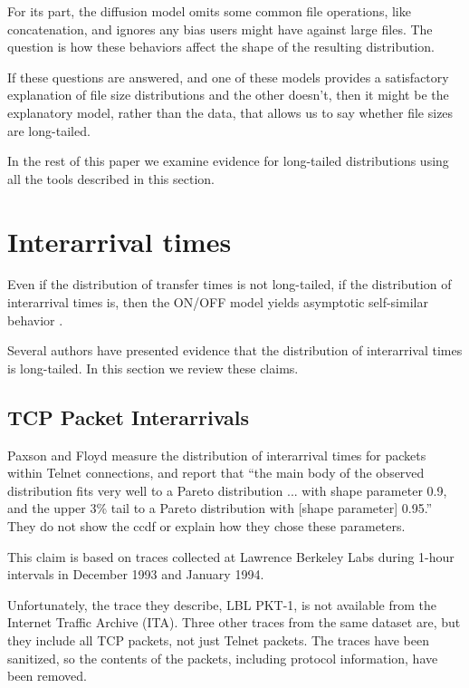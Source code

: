 \documentclass[twocolumn,11pt]{infocom}
\begin{document}
For its part, the diffusion model omits some common file operations,
like concatenation, and ignores any bias users might have
against large files.  The question is
how these behaviors affect the shape of the resulting distribution.

If these questions are answered, and one of these models provides a
satisfactory explanation of file size distributions and the other
doesn't, then it might be the explanatory model, rather than the data,
that allows us to say whether file sizes are long-tailed.

In the rest of this paper we examine evidence for long-tailed
distributions using all the tools described in this section.


\section {Interarrival times}

Even if the distribution of transfer times is not long-tailed,
if the distribution of interarrival times is, then the ON/OFF
model yields asymptotic self-similar behavior
\cite{TaqquWillingerSherman97}.

Several authors have presented evidence that the distribution
of interarrival times is long-tailed.  In this section we review
these claims.


\subsection{TCP Packet Interarrivals}

Paxson and Floyd \cite{PaxsonFloyd95}
measure the distribution of interarrival times for packets
within Telnet connections, and report that ``the main body
of the observed distribution fits very well to a Pareto
distribution ... with shape parameter 0.9, and the upper 3\%
tail to a Pareto distribution with [shape parameter] 0.95.''
They do not show the ccdf or explain how they chose these parameters.

This claim is based on traces collected at Lawrence Berkeley Labs
during 1-hour intervals in December 1993 and January 1994.

Unfortunately, the trace they describe, LBL
PKT-1, is not available from the Internet Traffic Archive (ITA).
Three other traces from the same dataset are, but they include all
TCP packets, not just Telnet packets.  The traces have been
sanitized, so the contents of the packets, including protocol
information, have been removed.
\end{document}
